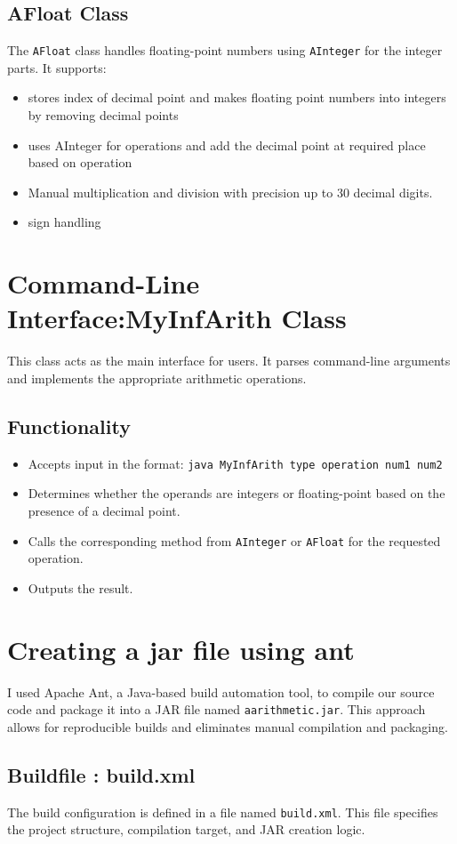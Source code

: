 \documentclass{article}
\begin{document}
\subsection*{AFloat Class}
The \texttt{AFloat} class handles floating-point numbers using \texttt{AInteger} for the integer parts. It supports:
\begin{itemize}
    \item stores index of decimal point and makes floating point numbers into integers by removing decimal points
    \item uses AInteger for operations and add the decimal point at required place based on operation
    \item Manual multiplication and division with precision up to 30 decimal digits.
    \item sign handling
\end{itemize}

\section*{Command-Line Interface:MyInfArith Class}
This class acts as the main interface for users. It parses command-line arguments and implements the appropriate arithmetic operations.
\subsection*{Functionality}
\begin{itemize}
    \item Accepts input in the format: \texttt{java MyInfArith type operation num1 num2}
    \item Determines whether the operands are integers or floating-point based on the presence of a decimal point.
    \item Calls the corresponding method from \texttt{AInteger} or \texttt{AFloat} for the requested operation.
    \item Outputs the result.
\end{itemize}
\section*{Creating a jar file using ant}
I used Apache Ant, a Java-based build automation tool, to compile our source code and package it into a JAR file named \texttt{aarithmetic.jar}. This approach allows for reproducible builds and eliminates manual compilation and packaging.
\subsection*{Buildfile : build.xml}
    The build configuration is defined in a file named \texttt{build.xml}. This file specifies the project structure, compilation target, and JAR creation logic.
\end{document}
